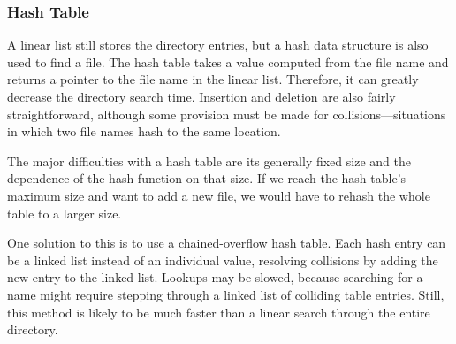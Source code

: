 \subsubsection{Hash Table}\label{subsubsec:Hash_Table_Directory}
A linear list still stores the directory entries, but a hash data structure is also used to find a file.
The hash table takes a value computed from the file name and returns a pointer to the file name in the linear list.
Therefore, it can greatly decrease the directory search time.
Insertion and deletion are also fairly straightforward, although some provision must be made for collisions—situations in which two file names hash to the same location.

The major difficulties with a hash table are its generally fixed size and the
dependence of the hash function on that size.
If we reach the hash table's maximum size and want to add a new file, we would have to rehash the whole table to a larger size.

One solution to this is to use a chained-overflow hash table.
Each hash entry can be a linked list instead of an individual value, resolving collisions by adding the new entry to the linked list.
Lookups may be slowed, because searching for a name might require stepping through a linked list of colliding table entries.
Still, this method is likely to be much faster than a linear search through the entire directory.

